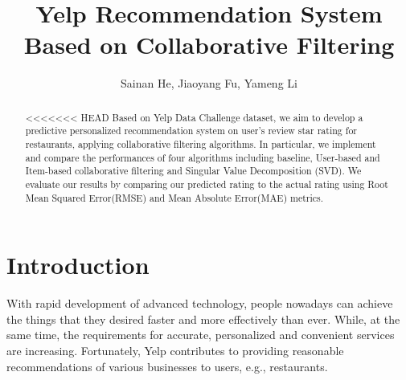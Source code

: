 \documentclass{llncs}
\begin{document}
%
\frontmatter          %
%
\pagestyle{headings}  %


%

%
\mainmatter              %
%
\title{Yelp Recommendation System Based on Collaborative Filtering}
%
%
\author{Sainan He, Jiaoyang Fu, Yameng Li}
%
%
%

\maketitle              %

\begin{abstract}
<<<<<<< HEAD
Based on Yelp Data Challenge dataset, we aim to develop a predictive personalized recommendation system on user’s review star rating for restaurants, applying collaborative filtering algorithms. In particular, we implement and compare the performances of four algorithms including baseline, User-based and Item-based collaborative filtering and Singular Value Decomposition (SVD). We evaluate our results by comparing our predicted rating to the actual rating using Root Mean Squared Error(RMSE) and Mean Absolute Error(MAE) metrics.

\end{abstract}

\section{Introduction}
With rapid development of advanced technology, people nowadays can achieve the things that they desired faster and more effectively than ever. While, at the same time, the requirements for accurate, personalized and convenient services are increasing. Fortunately, Yelp contributes to providing reasonable recommendations of various businesses to users, e.g., restaurants.
\end{document}
